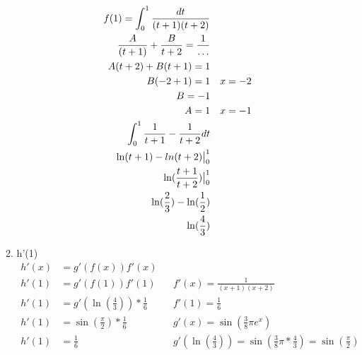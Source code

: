\documentclass[11pt]{article}
\newcommand{\bv}[2]{\big\vert_{#1}^{#2}}
\begin{document}
\begin{enumerate}
\begin{enumerate}
\begin{align*}
                f(1) = \int_{0}^{1} \frac{dt}{(t+1)(t+2)} \\
                \frac{A}{(t+1)} + \frac{B}{t+2}  = \frac{1}{\mathellipsis} \\
                A(t+2) + B(t+1) = 1 \\
                B(-2 + 1) = 1 && x = -2 \\
                B = -1 \\
                A = 1 && x = -1 \\
                \int_{0}^{1} \frac{1}{t+1} - \frac{1}{t+2} dt \\
                \ln(t+1) - ln(t+2) \bv{0}{1} \\
                \ln(\frac{t+1}{t+2}) \bv{0}{1} \\
                \ln(\frac{2}{3}) - \ln(\frac{1}{2}) \\
                \ln(\frac{4}{3}) \\
            \end{align*}
            \item h'(1)
            \begin{align*}
                \label{eq:5b}
                h'(x) &= g'(f(x))  f'(x) \\
                h'(1) &= g'(f(1))  f'(1) && f'(x) = \frac{1}{(x+1)(x+2)}\\
                h'(1) &= g'(\ln(\frac{4}{3})) *\frac{1}{6} && f'(1) = \frac{1}{6} \\
                h'(1) &= \sin(\frac{\pi}{2}) * \frac{1}{6} && g'(x) = \sin(\frac{3}{8}\pi e^x) \\
                h'(1) &= \frac{1}{6} && g'(\ln(\frac{4}{3})) = \sin(\frac{3}{8}\pi * \frac{4}{3})=  \sin(\frac{\pi}{2}) \\
            \end{align*}
        \end{enumerate}
    \end{enumerate}
\end{document}
